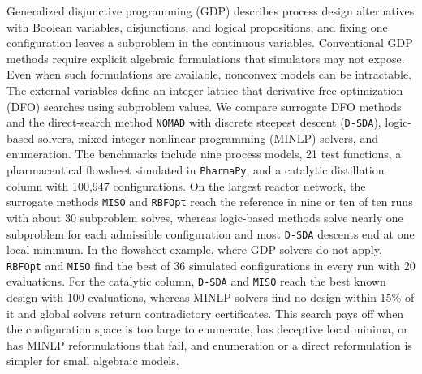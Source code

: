 Generalized disjunctive programming (GDP) describes process design alternatives with Boolean variables, disjunctions, and logical propositions, and fixing one configuration leaves a subproblem in the continuous variables.
Conventional GDP methods require explicit algebraic formulations that simulators may not expose.
Even when such formulations are available, nonconvex models can be intractable.
The external variables define an integer lattice that derivative-free optimization (DFO) searches using subproblem values.
We compare surrogate DFO methods and the direct-search method \texttt{NOMAD} with discrete steepest descent (\texttt{D-SDA}), logic-based solvers, mixed-integer nonlinear programming (MINLP) solvers, and enumeration.
The benchmarks include nine process models, 21 test functions, a pharmaceutical flowsheet simulated in \texttt{PharmaPy}, and a catalytic distillation column with 100,947 configurations.
On the largest reactor network, the surrogate methods \texttt{MISO} and \texttt{RBFOpt} reach the reference in nine or ten of ten runs with about 30 subproblem solves, whereas logic-based methods solve nearly one subproblem for each admissible configuration and most \texttt{D-SDA} descents end at one local minimum.
In the flowsheet example, where GDP solvers do not apply, \texttt{RBFOpt} and \texttt{MISO} find the best of 36 simulated configurations in every run with 20 evaluations.
For the catalytic column, \texttt{D-SDA} and \texttt{MISO} reach the best known design with 100 evaluations, whereas MINLP solvers find no design within 15\% of it and global solvers return contradictory certificates.
This search pays off when the configuration space is too large to enumerate, has deceptive local minima, or has MINLP reformulations that fail, and enumeration or a direct reformulation is simpler for small algebraic models.
